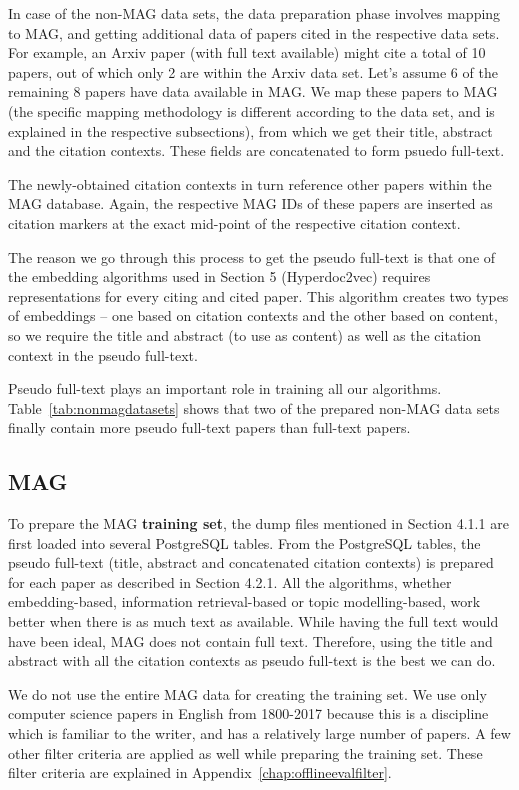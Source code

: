 In case of the non-MAG data sets, the data preparation phase involves mapping to MAG, and getting additional data of papers cited in the respective data sets. For example, an Arxiv paper (with full text available) might cite a total of 10 papers, out of which only 2 are within the Arxiv data set. Let's assume 6 of the remaining 8 papers have data available in MAG. We map these papers to MAG (the specific mapping methodology is different according to the data set, and is explained in the respective subsections), from which we get their title, abstract and the citation contexts. These fields are concatenated to form psuedo full-text.

The newly-obtained citation contexts in turn reference other papers within the MAG database. Again, the respective MAG IDs of these papers are inserted as citation markers at the exact mid-point of the respective citation context.  

The reason we go through this process to get the pseudo full-text is that one of the embedding algorithms used in Section 5 (Hyperdoc2vec) requires representations for every citing and cited paper. This algorithm creates two types of embeddings -- one based on citation contexts and the other based on content, so we require the title and abstract (to use as content) as well as the citation context in the pseudo full-text. 

Pseudo full-text plays an important role in training all our algorithms. Table~\ref{tab:nonmagdatasets} shows that two of the prepared non-MAG data sets finally contain more pseudo full-text papers than full-text papers.
\subsection{MAG}
To prepare the MAG \textbf{training set}, the dump files mentioned in Section 4.1.1 are first loaded into several PostgreSQL tables. From the PostgreSQL tables, the pseudo full-text (title, abstract and concatenated citation contexts) is prepared for each paper as described in Section 4.2.1. 
All the algorithms, whether embedding-based, information retrieval-based or topic modelling-based, work better when there is as much text as available. While having the full text would have been ideal, MAG does not contain full text. Therefore, using the title and abstract with all the citation contexts as pseudo full-text is the best we can do.

We do not use the entire MAG data for creating the training set. We use only computer science papers in English from 1800-2017 because this is a discipline which is familiar to the writer, and has a relatively large number of papers. A few other filter criteria are applied as well while preparing the training set. These filter criteria are explained in Appendix~\ref{chap:offlineevalfilter}.

